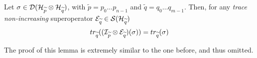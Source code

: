 \begin{lemma}\label{trace_and_sop_2}
Let $\sigma \in  \mathcal{D}(\mathcal{H}_{\widetilde{p}} \otimes \mathcal{H}_{\widetilde{q}})$, with $\widetilde{p} = p_0 \ldots p_{n-1}$ and $\widetilde{q} = q_0 \ldots q_{m-1}$. Then, for any \textit{trace non-increasing} superoperator $\mathcal{E}_{\widetilde{q}} \in \mathcal{S}(\mathcal{H}_{\widetilde{q}})$
\[ tr_{\widetilde{q}}((\mathcal{I}_{\widetilde{p}} \otimes \mathcal{E}_{\widetilde{q}})(\sigma)) = tr_{\widetilde{q}}(\sigma)
\]
\end{lemma}

The proof of this lemma is extremely similar to the one before, and thus omitted. 


